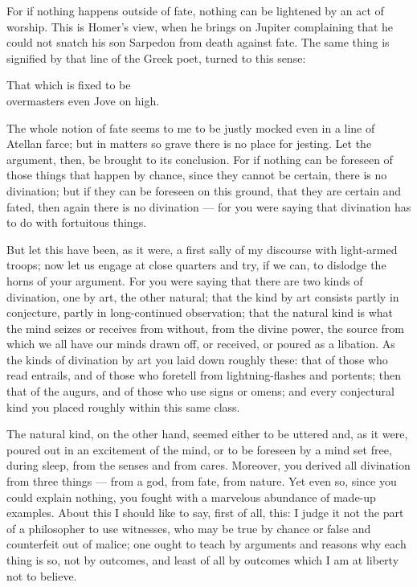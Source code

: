  For if nothing happens outside of fate, nothing can be lightened by an act of worship. This is Homer's view, when he brings on Jupiter complaining that he could not snatch his son Sarpedon from death against fate. The same thing is signified by that line of the Greek poet, turned to this sense:

That which is fixed to be \\
overmasters even Jove on high.

The whole notion of fate seems to me to be justly mocked even in a line of Atellan farce; but in matters so grave there is no place for jesting. Let the argument, then, be brought to its conclusion. For if nothing can be foreseen of those things that happen by chance, since they cannot be certain, there is no divination; but if they can be foreseen on this ground, that they are certain and fated, then again there is no divination — for you were saying that divination has to do with fortuitous things.

 But let this have been, as it were, a first sally of my discourse with light-armed troops; now let us engage at close quarters and try, if we can, to dislodge the horns of your argument. For you were saying that there are two kinds of divination, one by art, the other natural; that the kind by art consists partly in conjecture, partly in long-continued observation; that the natural kind is what the mind seizes or receives from without, from the divine power, the source from which we all have our minds drawn off, or received, or poured as a libation. As the kinds of divination by art you laid down roughly these: that of those who read entrails, and of those who foretell from lightning-flashes and portents; then that of the augurs, and of those who use signs or omens; and every conjectural kind you placed roughly within this same class.

 The natural kind, on the other hand, seemed either to be uttered and, as it were, poured out in an excitement of the mind, or to be foreseen by a mind set free, during sleep, from the senses and from cares. Moreover, you derived all divination from three things — from a god, from fate, from nature. Yet even so, since you could explain nothing, you fought with a marvelous abundance of made-up examples. About this I should like to say, first of all, this: I judge it not the part of a philosopher to use witnesses, who may be true by chance or false and counterfeit out of malice; one ought to teach by arguments and reasons why each thing is so, not by outcomes, and least of all by outcomes which I am at liberty not to believe.

